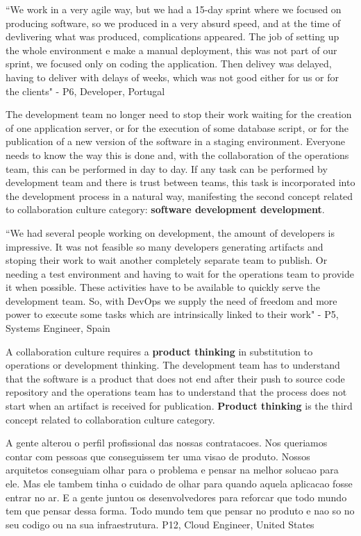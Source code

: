 ``We work in a very agile way, but we had a 15-day sprint where we focused on
producing software, so we produced in a very absurd speed, and at the time of
devlivering what was produced, complications appeared. The job of setting up
the whole environment e make a manual deployment, this was not part of our
sprint, we focused only on coding the application. Then delivey was delayed,
having to deliver with delays of weeks, which was not good either for us or for
the clients" - P6, Developer, Portugal

The development team no longer need to stop their work waiting for the creation
of one application server, or for the execution of some database script, or for
the publication of a new version of the software in a staging environment.
Everyone needs to know the way this is done and, with the collaboration of the
operations team, this can be performed in day to day. If any task can be
performed by development team and there is trust between teams, this task is
incorporated into the development process in a natural way, manifesting the
second concept related to collaboration culture category: \textbf{software
development development}.

``We had several people working on development, the amount of developers is
impressive. It was not feasible so many developers generating artifacts and
stoping their work to wait another completely separate team to publish. Or
needing a test environment and having to wait for the operations team to
provide it when possible. These activities have to be available to quickly
serve the development team. So, with DevOps we supply the need of freedom and
more power to execute some tasks which are intrinsically linked to their work"
- P5, Systems Engineer, Spain

A collaboration culture requires a \textbf{product thinking} in substitution to
operations or development thinking. The development team has to understand that
the software is a product that does not end after their push to source code
repository and the operations team has to understand that the process does not
start when an artifact is received for publication. \textbf{Product thinking}
is the third concept related to collaboration culture category.

A gente alterou o perfil profissional das nossas contratacoes. Nos queriamos
contar com pessoas que conseguissem ter uma visao de produto. Nossos arquitetos
conseguiam olhar para o problema e pensar na melhor solucao para ele. Mas ele
tambem tinha o cuidado de olhar para quando aquela aplicacao fosse entrar no ar.
E a gente juntou os desenvolvedores para reforcar que todo mundo tem que pensar
dessa forma. Todo mundo tem que pensar no produto e nao so no seu codigo ou na
sua infraestrutura. P12, Cloud Engineer, United States

